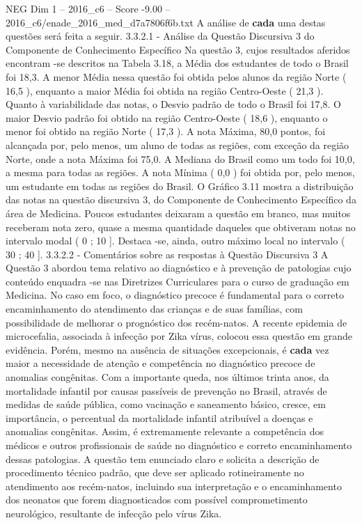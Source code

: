 \begin{textsample}{NEG Dim 1 – 2016\_c6 – Score -9.00 – 2016\_c6/enade\_2016\_med\_d7a7806f6b.txt}
A análise de \textbf{cada} uma destas questões será feita a seguir. 3.3.2.1 - Análise da Questão Discursiva 3 do Componente de Conhecimento Específico Na questão 3, cujos resultados aferidos encontram -se descritos na Tabela 3.18, a Média dos estudantes de todo o Brasil foi 18,3.
A menor Média nessa questão foi obtida pelos alunos da região Norte ( 16,5 ), enquanto a maior Média foi obtida na região Centro-Oeste ( 21,3 ).
Quanto à variabilidade das notas, o Desvio padrão de todo o Brasil foi 17,8.
O maior Desvio padrão foi obtido na região Centro-Oeste ( 18,6 ), enquanto o menor foi obtido na região Norte ( 17,3 ).
A nota Máxima, 80,0 pontos, foi alcançada por, pelo menos, um aluno de todas as regiões, com exceção da região Norte, onde a nota Máxima foi 75,0.
A Mediana do Brasil como um todo foi 10,0, a mesma para todas as regiões.
A nota Mínima ( 0,0 ) foi obtida por, pelo menos, um estudante em todas as regiões do Brasil.
O Gráfico 3.11 mostra a distribuição das notas na questão discursiva 3, do Componente de Conhecimento Específico da área de Medicina.
Poucos estudantes deixaram a questão em branco, mas muitos receberam nota zero, quase a mesma quantidade daqueles que obtiveram notas no intervalo modal ( 0 ; 10 ].
Destaca -se, ainda, outro máximo local no intervalo ( 30 ; 40 ]. 3.3.2.2 - Comentários sobre as respostas à Questão Discursiva 3 A Questão 3 abordou tema relativo ao diagnóstico e à prevenção de patologias cujo conteúdo enquadra -se nas Diretrizes Curriculares para o curso de graduação em Medicina.
No caso em foco, o diagnóstico precoce é fundamental para o correto encaminhamento do atendimento das crianças e de suas famílias, com possibilidade de melhorar o prognóstico dos recém-natos.
A recente epidemia de microcefalia, associada à infecção por Zika vírus, colocou essa questão em grande evidência.
Porém, mesmo na ausência de situações excepcionais, é \textbf{cada} vez maior a necessidade de atenção e competência no diagnóstico precoce de anomalias congênitas.
Com a importante queda, nos últimos trinta anos, da mortalidade infantil por causas passíveis de prevenção no Brasil, através de medidas de saúde pública, como vacinação e saneamento básico, cresce, em importância, o percentual da mortalidade infantil atribuível a doenças e anomalias congênitas.
Assim, é extremamente relevante a competência dos médicos e outros profissionais de saúde no diagnóstico e correto encaminhamento dessas patologias.
A questão tem enunciado claro e solicita a descrição de procedimento técnico padrão, que deve ser aplicado rotineiramente no atendimento aos recém-natos, incluindo sua interpretação e o encaminhamento dos neonatos que forem diagnosticados com possível comprometimento neurológico, resultante de infecção pelo vírus Zika.

\end{textsample}
